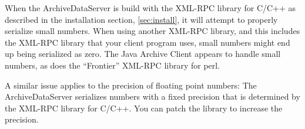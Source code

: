 When the ArchiveDataServer is build with the XML-RPC library for C/C++
as described in the installation section, \ref{sec:install}, it will
attempt to properly serialize small numbers.  When using another
XML-RPC library, and this includes the XML-RPC library that your
client program uses, small numbers might end up being serialized as
zero. The Java Archive Client appears to handle small numbers, as does
the ``Frontier'' XML-RPC library for perl.

A similar issue applies to the precision of floating point numbers:
The ArchiveDataServer serializes numbers with a fixed precision that
is determined by the XML-RPC library for C/C++. You can patch the
library to increase the precision.

